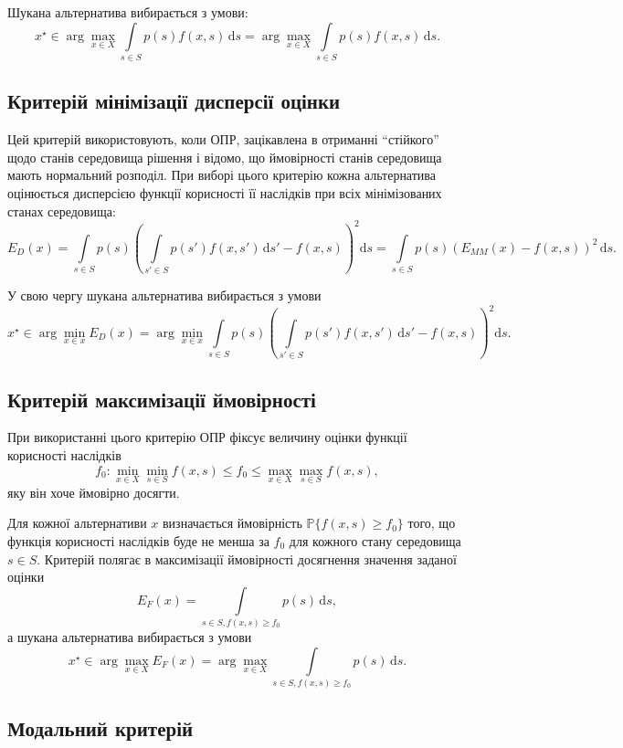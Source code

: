 Шукана альтернатива вибирається з умови:
\[x^\star \in \arg \max\limits_{x \in X} \int\limits_{s \in S} p(s) f(x, s) \, \mathrm{d} s = \arg \max\limits_{x \in X} \int\limits_{s \in S} p(s) f(x, s) \, \mathrm{d} s.\]

\subsection{Критерій мінімізації дисперсії оцінки}

Цей критерій використовують, коли ОПР, зацікавлена в отриманні ``стійкого'' щодо станів середовища рішення і відомо, що ймовірності станів середовища мають нормальний розподіл. При виборі цього критерію кожна альтернатива оцінюється дисперсією функції корисності її наслідків при всіх мінімізованих станах середовища:
\[E_D(x) = \int\limits_{s \in S} p(s) \left( \int\limits_{s' \in S} p(s') f(x, s') \, \mathrm{d} s' - f(x, s) \right)^2 \mathrm{d} s = \int\limits_{s \in S} p(s) (E_{MM}(x) - f(x, s))^2 \, \mathrm{d} s.\]

У свою чергу шукана альтернатива вибирається з умови
\[x^\star \in \arg\min\limits_{x \in x} E_D(x) = \arg\min\limits_{x \in x} \int\limits_{s \in S} p(s) \left( \int\limits_{s' \in S} p(s') f(x, s') \, \mathrm{d} s' - f(x, s) \right)^2 \mathrm{d} s.\]

\subsection{Критерій максимізації ймовірності}

При використанні цього критерію ОПР фіксує величину оцінки функції корисності наслідків 
\[f_0: \min\limits_{x \in X} \min\limits_{s \in S} f(x, s) \le f_0 \le \max\limits_{x \in X} \max\limits_{s \in S} f(x, s),\]
яку він хоче ймовірно досягти. \medskip

Для кожної альтернативи $x$ визначається ймовірність $\mathbb{P} \{ f(x, s) \ge f_0 \}$ того, що функція корисності наслідків буде не менша за $f_0$ для кожного стану середовища $s \in S$. Критерій полягає в максимізації ймовірності досягнення значення заданої оцінки
\[E_F(x) = \int\limits_{s \in S, f(x, s) \ge f_0} p(s) \, \mathrm{d} s,\]
а шукана альтернатива вибирається з умови
\[x^\star \in \arg\max\limits_{x \in X} E_F(x) = \arg\max\limits_{x \in X} \int\limits_{s \in S, f(x, s) \ge f_0} p(s) \, \mathrm{d} s.\]

\subsection{Модальний критерій}

